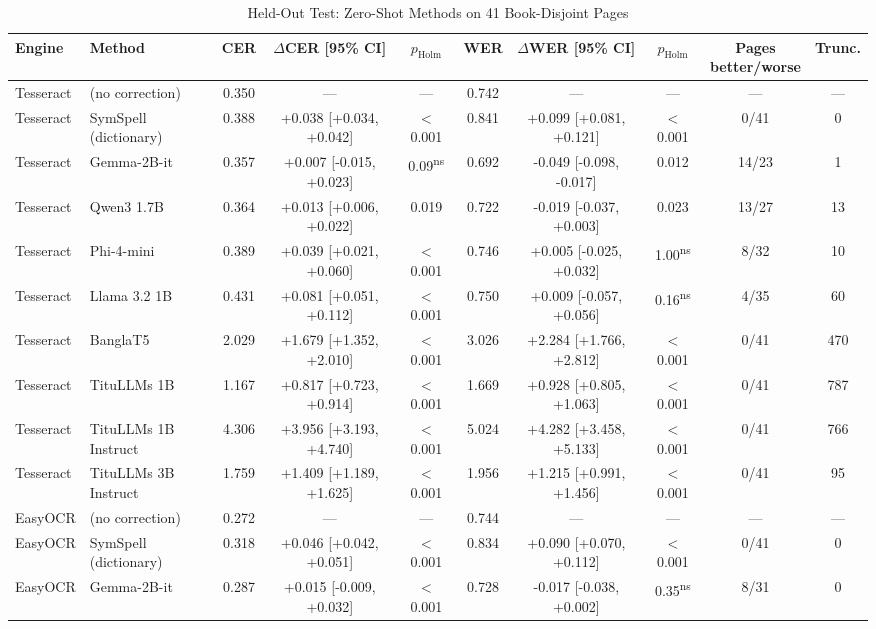 \begin{table}[t]
\centering
\caption{Held-Out Test: Zero-Shot Methods on 41 Book-Disjoint Pages}
\label{tab:testzeroshot}
\setlength{\tabcolsep}{3pt}
\footnotesize
\begin{tabular}{llcccccccc}
\toprule
Engine & Method & CER & $\Delta$CER [95\% CI] & $p_{\mathrm{Holm}}$ & WER & $\Delta$WER [95\% CI] & $p_{\mathrm{Holm}}$ & \shortstack{Pages\\better/worse} & Trunc. \\
\midrule
Tesseract & (no correction) & 0.350 & --- & --- & 0.742 & --- & --- & --- & --- \\
Tesseract & SymSpell (dictionary) & 0.388 & +0.038 [+0.034, +0.042] & $<$0.001 & 0.841 & +0.099 [+0.081, +0.121] & $<$0.001 & 0/41 & 0 \\
Tesseract & Gemma-2B-it & 0.357 & +0.007 [-0.015, +0.023] & 0.09\textsuperscript{ns} & 0.692 & -0.049 [-0.098, -0.017] & 0.012 & 14/23 & 1 \\
Tesseract & Qwen3 1.7B & 0.364 & +0.013 [+0.006, +0.022] & 0.019 & 0.722 & -0.019 [-0.037, +0.003] & 0.023 & 13/27 & 13 \\
Tesseract & Phi-4-mini & 0.389 & +0.039 [+0.021, +0.060] & $<$0.001 & 0.746 & +0.005 [-0.025, +0.032] & 1.00\textsuperscript{ns} & 8/32 & 10 \\
Tesseract & Llama 3.2 1B & 0.431 & +0.081 [+0.051, +0.112] & $<$0.001 & 0.750 & +0.009 [-0.057, +0.056] & 0.16\textsuperscript{ns} & 4/35 & 60 \\
\cmidrule(lr){2-10}
Tesseract & BanglaT5 & 2.029 & +1.679 [+1.352, +2.010] & $<$0.001 & 3.026 & +2.284 [+1.766, +2.812] & $<$0.001 & 0/41 & 470 \\
Tesseract & TituLLMs 1B & 1.167 & +0.817 [+0.723, +0.914] & $<$0.001 & 1.669 & +0.928 [+0.805, +1.063] & $<$0.001 & 0/41 & 787 \\
Tesseract & TituLLMs 1B Instruct & 4.306 & +3.956 [+3.193, +4.740] & $<$0.001 & 5.024 & +4.282 [+3.458, +5.133] & $<$0.001 & 0/41 & 766 \\
Tesseract & TituLLMs 3B Instruct & 1.759 & +1.409 [+1.189, +1.625] & $<$0.001 & 1.956 & +1.215 [+0.991, +1.456] & $<$0.001 & 0/41 & 95 \\
\midrule
EasyOCR & (no correction) & 0.272 & --- & --- & 0.744 & --- & --- & --- & --- \\
EasyOCR & SymSpell (dictionary) & 0.318 & +0.046 [+0.042, +0.051] & $<$0.001 & 0.834 & +0.090 [+0.070, +0.112] & $<$0.001 & 0/41 & 0 \\
EasyOCR & Gemma-2B-it & 0.287 & +0.015 [-0.009, +0.032] & $<$0.001 & 0.728 & -0.017 [-0.038, +0.002] & 0.35\textsuperscript{ns} & 8/31 & 0 \\

\end{tabular}
\end{table}
